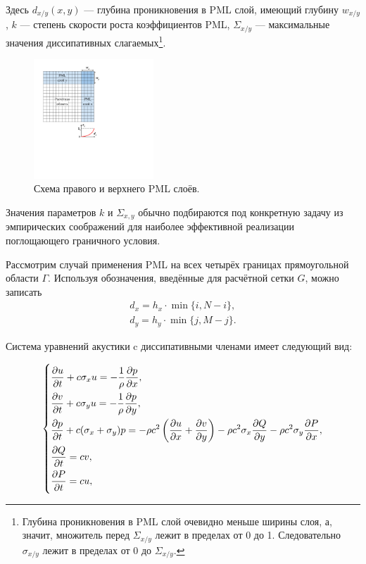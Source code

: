 \noindent Здесь $d_{x/y}(x,y)$ --- глубина проникновения в PML слой, имеющий глубину $w_{x/y}$, $k$ --- степень скорости роста коэффициентов PML, $\Sigma_{x/y}$ --- максимальные значения диссипативных слагаемых\footnote{Глубина проникновения в PML слой очевидно меньше ширины слоя, а, значит, множитель перед $\Sigma_{x/y}$ лежит в пределах от 0 до 1. Следовательно $\sigma_{x/y}$ лежит в пределах от 0 до $\Sigma_{x/y}$.}. 

\begin{figure}[htp]
    \centering
    \includegraphics[trim={72pt 325pt 430pt 55pt},clip,width=0.4\textwidth]{images/pml/pml_scheme.png}
    \caption{Схема правого и верхнего PML слоёв.}
    \label{fig:pml_scheme}
\end{figure}

Значения параметров $k$ и $\Sigma_{x,y}$ обычно подбираются под конкретную задачу из эмпирических соображений для наиболее эффективной реализации поглощающего граничного условия.

Рассмотрим случай применения PML на всех четырёх границах прямоугольной области $\Gamma$. Используя обозначения, введённые для расчётной сетки $G$, можно записать
\begin{gather*}
	d_x = h_x \cdot \min\{i, N - i\}  , \\
	d_y = h_y \cdot \min\{j, M - j\}  .
\end{gather*}
    
Система уравнений акустики c диссипативными членами \cite{pml_from_maxwell} имеет следующий вид:
    
\begin{equation}
	\begin{dcases}
		\frac{\partial u}{\partial t} + c\sigma_x u = -\frac{1}{\rho}\frac{\partial p}{\partial x} ,\\
		\frac{\partial v}{\partial t} + c\sigma_y u = -\frac{1}{\rho}\frac{\partial p}{\partial y} ,\\
	    \frac{\partial p}{\partial t} + c(\sigma_x + \sigma_y) p = -\rho c^2 \left(\frac{\partial u}{\partial x}+\frac{\partial v}{\partial y}\right) - \rho c^2 \sigma_x \frac{\partial Q}{\partial y} - \rho c^2 \sigma_y \frac{\partial P}{\partial x} ,\\
	    \frac{\partial Q}{\partial t} = c v ,\\
	    \frac{\partial P}{\partial t} = c u ,
	\end{dcases}\label{eq:pml} 
\end{equation}
    
